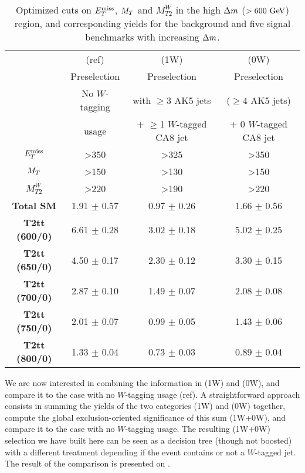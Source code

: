     \begin{table}
        \centering
        \begin{tabular}{c|c|cc}
                                   & (ref)             & (1W)                         & (0W)                    \\
                                   & Preselection      & Preselection                 & Preselection           \\
                                   & No $W$-tagging    & with $\geq$3 AK5 jets        & ($\geq$4 AK5 jets)     \\
                                   & usage             & + $\geq$1 $W$-tagged CA8 jet & + 0 $W$-tagged CA8 jet \\
            \hline
            \textbf{$E_T^\text{miss}$}        & >350              & >325 & >350 \\
            \textbf{$M_T$}         & >150              & >130 & >150 \\
            \textbf{$M_{T2}^{W}$}  & >220              & >190 & >220 \\
            \hline
            \hline
            \textbf{Total SM}      & 1.91 $\pm$ 0.57   & 0.97 $\pm$ 0.26     &  1.66 $\pm$ 0.56    \\
            \hline
            \textbf{T2tt (600/0)}   & 6.61 $\pm$ 0.28  & 3.02 $\pm$ 0.18     &  5.02 $\pm$ 0.25    \\
            \textbf{T2tt (650/0)}   & 4.50 $\pm$ 0.17  & 2.30 $\pm$ 0.12     &  3.30 $\pm$ 0.15    \\
            \textbf{T2tt (700/0)}   & 2.87 $\pm$ 0.10  & 1.49 $\pm$ 0.07     &  2.08 $\pm$ 0.08    \\
            \textbf{T2tt (750/0)}   & 2.01 $\pm$ 0.07  & 0.99 $\pm$ 0.05     &  1.43 $\pm$ 0.06    \\
            \textbf{T2tt (800/0)}   & 1.33 $\pm$ 0.04  & 0.73 $\pm$ 0.03     &  0.89 $\pm$ 0.04
        \end{tabular}
        \caption{Optimized cuts on $E_T^\text{miss}$, $M_T$ and $M_{T2}^{W}$ in the high $\Delta m$
                 ($> 600~\text{GeV}$) region, and corresponding yields for the background and five signal
                 benchmarks with increasing $\Delta m$.}
                 \label{tab:wTaggingAnalysisCuts}
    \end{table}

    We are now interested in combining the information in (1W) and (0W), and compare
    it to the case with no $W$-tagging usage (ref). A straightforward approach consists
    in summing the yields of the two categories (1W) and (0W) together, compute
    the global exclusion-oriented significance of this sum (1W+0W), and compare it to
    the case with no $W$-tagging usage. The resulting (1W+0W) selection we have built
    here can be seen as a decision tree (though not boosted) with a different treatment
    depending if the event contains or not a $W$-tagged jet. The result of the comparison
    is presented on .

